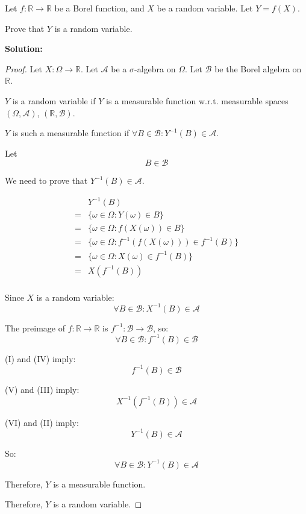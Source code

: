 \documentclass{article}
\begin{document}
Let \(f : \mathbb{R} \to \mathbb{R}\) be a Borel function, and \(X\) be a
random variable. Let \(Y = f(X)\).

Prove that \(Y\) is a random variable.

\textbf{Solution:}

\begin{proof}
Let \(X:\Omega\to \mathbb{R}\).
Let \(\mathcal{A}\) be a \(\sigma\)-algebra on \(\Omega\).
Let \(\mathcal{B}\) be the Borel algebra on \(\mathbb{R}\).

\(Y\) is a random variable if \(Y\) is a measurable function w.r.t. measurable
spaces \((\Omega, \mathcal{A})\), \((\mathbb{R}, \mathcal{B})\).

\(Y\) is such a measurable function if \(\forall B\in \mathcal{B}: Y^{-1}(B)\in \mathcal{A}\).

Let
\[B\in \mathcal{B}\tag{I}\]

We need to prove that \(Y^{-1}(B)\in \mathcal{A}\).

\begin{align*}
	 & Y^{-1}(B) \\
	=& \{\omega\in \Omega: Y(\omega)\in B\} \\
	=& \{\omega\in \Omega: f(X(\omega))\in B\} \\
	=& \{\omega\in \Omega: f^{-1}(f(X(\omega)))\in f^{-1}(B)\} \\
	=& \{\omega\in \Omega: X(\omega)\in f^{-1}(B)\} \\
	=& X(f^{-1}(B)) \tag{II} \\
\end{align*}

Since \(X\) is a random variable:
\[\forall B\in \mathcal{B}: X^{-1}(B)\in \mathcal{A} \tag{III}\]

The preimage of \(f:\mathbb{R}\to\mathbb{R}\) is \(f^{-1}: \mathcal{B} \to\mathcal{B}\), so:
\[\forall B \in \mathcal{B}: f^{-1}(B)\in \mathcal{B} \tag{IV}\]

(I) and (IV) imply:
\[f^{-1}(B) \in \mathcal{B} \tag{V}\]

(V) and (III) imply:
\[X^{-1}(f^{-1}(B))\in \mathcal{A}\tag{VI}\]

(VI) and (II) imply:
\[Y^{-1}(B) \in \mathcal{A}\]

So:
\[\forall B\in \mathcal{B}:Y^{-1}(B) \in \mathcal{A}\]

Therefore, \(Y\) is a measurable function.

Therefore, \(Y\) is a random variable.
\end{proof}
\end{document}

